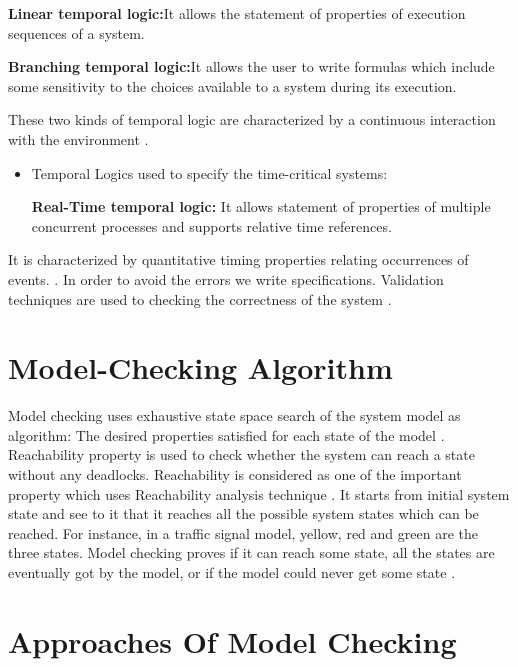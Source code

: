 \documentclass[a4paper,12pt]{report}
\begin{document}
\begin{onehalfspacing}
\begin{itemize}
\textbf{Linear temporal logic:}It allows the statement of properties of execution sequences of a system.

 \textbf{Branching temporal logic:}It allows the user to write formulas which include some sensitivity to the choices available to a system during its execution.
\end{itemize}
 These two kinds of temporal logic are characterized by a continuous interaction with the environment \cite{DawsonEngler}.
\begin{itemize}
\item Temporal Logics used to specify the time-critical systems:

 \textbf{Real-Time temporal logic:}  It allows statement of properties of multiple concurrent processes and supports relative time references.
\end{itemize}

It is characterized by quantitative timing properties relating occurrences of events. \cite{DawsonEngler}.
In order to avoid the errors we write specifications. Validation techniques are used to checking the correctness of the system \cite{Wang2007}.  

\section{Model-Checking Algorithm}
\label{Model chec Algo}

Model checking uses exhaustive state space search of the system model as algorithm: The desired properties satisfied for each state of the model \cite{B.Berard2001}. Reachability property is used to check whether the system can reach a state without any deadlocks. Reachability is considered as one of the important property which uses Reachability analysis technique \cite{M.Davis1962}. It starts from initial system state and see to it that it reaches all the possible system states which can be reached. For instance, in a traffic signal model, yellow, red and green are the three states. Model checking proves if it can reach some state, all the states are eventually got by the model, or if the model could never get some state \cite{M.Davis1962}.

\section{Approaches Of Model Checking}
\label{Appr to model check}


\end{onehalfspacing}
\end{document}
